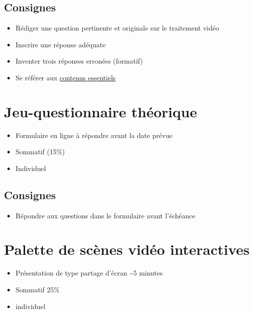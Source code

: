\documentclass[
]{book}
\providecommand{\tightlist}{%
  \setlength{\itemsep}{0pt}\setlength{\parskip}{0pt}}
\begin{document}
\hypertarget{consignes-1}{%
\subsection{Consignes}\label{consignes-1}}

\begin{itemize}
\tightlist
\item
  Rédiger une question pertinente et originale sur le traitement vidéo
\item
  Inscrire une réponse adéquate
\item
  Inventer trois réponses erronées (formatif)
\item
  Se référer aux \href{}{contenus essentiels}
\end{itemize}

\hypertarget{sommatif_3}{%
\section{Jeu-questionnaire théorique}\label{sommatif_3}}

\begin{itemize}
\tightlist
\item
  Formulaire en ligne à répondre avant la date prévue
\item
  Sommatif (15\%)
\item
  Individuel
\end{itemize}

\hypertarget{consignes-2}{%
\subsection{Consignes}\label{consignes-2}}

\begin{itemize}
\tightlist
\item
  Répondre aux questions dans le formulaire avant l'échéance
\end{itemize}

\hypertarget{sommatif_4}{%
\section{Palette de scènes vidéo interactives}\label{sommatif_4}}

\begin{itemize}
\tightlist
\item
  Présentation de type partage d'écran \textasciitilde5 minutes
\item
  Sommatif 25\%
\item
  individuel
\end{itemize}
\end{document}
